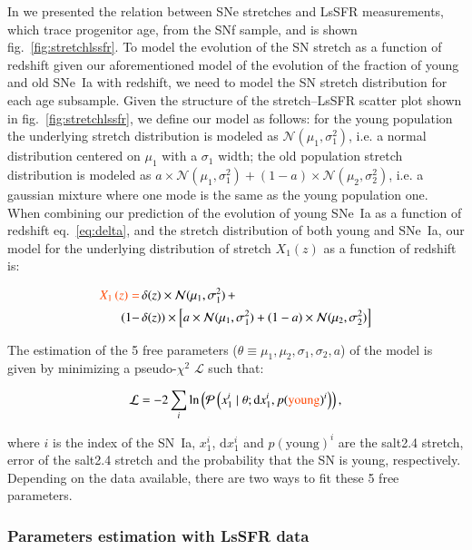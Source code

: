 \documentclass[]{aa} %
\newcommand{\nn}[1]{{\textcolor[rgb]{1, 0.27, 0}{#1}}}
\newcommand{\prob}[2]{\mathcal{P}\left( #1 \mid #2\right)}
\begin{document}
\nn{In \cite{rigault2018} we presented the relation between SNe stretches and
LsSFR measurements, which trace progenitor age, from the SNf sample, and is
shown fig.~\ref{fig:stretchlssfr}}. To model the evolution of the SN stretch as
a function of redshift given our aforementioned model of the evolution of the
fraction of young and old SNe~Ia with redshift, we need to model the SN stretch
distribution for each age subsample. Given the structure of the stretch--LsSFR
scatter plot shown in fig.~\ref{fig:stretchlssfr}, we define our model as
follows: for the young population the underlying stretch distribution is modeled
as $\mathcal{N}(\mu_1, \sigma_1^2)$, i.e. a normal distribution centered on
$\mu_1$ with a $\sigma_1$ width; the old population stretch distribution is
modeled as $a\times \mathcal{N}(\mu_1, \sigma_1^2) + (1-a)\times
\mathcal{N}(\mu_2, \sigma_2^2)$, i.e. a gaussian mixture where one mode is the
same as the young population one.  \nn{When combining our prediction of the
evolution of young SNe~Ia as a function of redshift eq.~\ref{eq:delta}, and the
stretch distribution of both young and SNe~Ia, our model for the underlying
distribution of stretch $X_1\left(z\right)$ as a function of redshift is:}

\begin{align}
    \label{eq:stretchz}
    \nn{X_1\left(z \right) =
    }&\,\delta(z)\times\mathcal{N}(\mu_1,\sigma_1^2)\,+\nonumber\\
    (1-&\,\delta(z)) \times  \left[a\times\mathcal{N}(\mu_1,\sigma_1^2) +
    (1-a)\times\mathcal{N}(\mu_2,\sigma_2^2)\right]
\end{align}

The estimation of the 5 free parameters
($\theta\equiv{\mu_1,\mu_2,\sigma_1,\sigma_2,a}$) of the model is given by
minimizing a pseudo-$\chi^2$ $\mathcal{L}$ such that:

\begin{equation}
    \label{eq:likelihood}
    \mathcal{L} = -2 \sum_i \ln\left( \prob{x^{i}_{1}}{ \theta;
    \mathrm{d}x^{i}_{1}, p(\nn{\text{young}})^{i}}\right),
\end{equation}

\nn{where $i$ is the index of the SN~Ia, $x^{i}_{1}$, $\mathrm{d}x^{i}_{1}$ and
$p(\text{young})^{i}$ are the salt2.4 stretch, error of the salt2.4 stretch and
the probability that the SN is young, respectively. Depending on the data
available, there are two ways to fit these 5 free parameters}.

\subsubsection{\nn{Parameters estimation with LsSFR data}}
\label{sec:modelpy}
\end{document}
